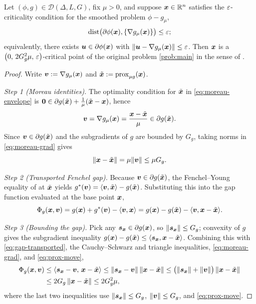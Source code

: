 \begin{lemma}
\label{lem:moreau-reduction}
Let $(\phi,g)\in\mathcal D(\Delta,L,G)$, fix $\mu>0$, and suppose
$\bm{x}\in\mathbb{R}^n$ satisfies the $\varepsilon$-criticality condition for the smoothed
problem $\phi-g_\mu$,
\[
    \operatorname{dist}\bigl(\partial\phi(\bm{x}),\{\nabla g_\mu(\bm{x})\}\bigr)\le\varepsilon ;
\]
equivalently, there exists $\bm{u}\in\partial\phi(\bm{x})$ with
$\|\bm{u}-\nabla g_\mu(\bm{x})\|\le\varepsilon$. Then $\bm{x}$ is a
$\bigl(0,\,2G_g^2\mu,\,\varepsilon\bigr)$-critical point of the original problem
\eqref{prob:main} in the sense of
.
\end{lemma}

\begin{proof}
Write $\bm{v}:=\nabla g_\mu(\bm{x})$ and $\tilde{\bm{x}}:=\mathrm{prox}_{\mu g}(\bm{x})$.

\emph{Step 1 (Moreau identities).}
The optimality condition for $\tilde{\bm{x}}$ in \eqref{eq:moreau-envelope} is
$\bm{0}\in\partial g(\tilde{\bm{x}})+\tfrac1\mu(\tilde{\bm{x}}-\bm{x})$, hence
\begin{equation}
    \bm{v}=\nabla g_\mu(\bm{x})=\frac{\bm{x}-\tilde{\bm{x}}}{\mu}\in\partial g(\tilde{\bm{x}}).
    \label{eq:moreau-grad}
\end{equation}
Since $\bm{v}\in\partial g(\tilde{\bm{x}})$ and the subgradients of $g$ are bounded by
$G_g$, taking norms in \eqref{eq:moreau-grad} gives
\begin{equation}
    \|\bm{x}-\tilde{\bm{x}}\|=\mu\|\bm{v}\|\le\mu G_g .
    \label{eq:prox-move}
\end{equation}

\emph{Step 2 (Transported Fenchel gap).}
Because $\bm{v}\in\partial g(\tilde{\bm{x}})$, the Fenchel--Young equality of
 at $\tilde{\bm{x}}$ yields
$g^*(\bm{v})=\langle\bm{v},\tilde{\bm{x}}\rangle-g(\tilde{\bm{x}})$. Substituting this into
the gap function evaluated at the base point $\bm{x}$,
\begin{equation}
    \Phi_g(\bm{x},\bm{v})
    =g(\bm{x})+g^*(\bm{v})-\langle\bm{v},\bm{x}\rangle
    =g(\bm{x})-g(\tilde{\bm{x}})-\langle\bm{v},\bm{x}-\tilde{\bm{x}}\rangle .
    \label{eq:gap-transported}
\end{equation}

\emph{Step 3 (Bounding the gap).}
Pick any $\bm{s}_{\bm{x}}\in\partial g(\bm{x})$, so $\|\bm{s}_{\bm{x}}\|\le G_g$; convexity of
$g$ gives the subgradient inequality
$g(\bm{x})-g(\tilde{\bm{x}})\le\langle\bm{s}_{\bm{x}},\bm{x}-\tilde{\bm{x}}\rangle$. Combining this
with \eqref{eq:gap-transported}, the Cauchy--Schwarz and triangle inequalities,
\eqref{eq:moreau-grad}, and \eqref{eq:prox-move},
\begin{align}
    \Phi_g(\bm{x},\bm{v})
    &\le \langle\bm{s}_{\bm{x}}-\bm{v},\,\bm{x}-\tilde{\bm{x}}\rangle
    \le \|\bm{s}_{\bm{x}}-\bm{v}\|\,\|\bm{x}-\tilde{\bm{x}}\|
    \le \bigl(\|\bm{s}_{\bm{x}}\|+\|\bm{v}\|\bigr)\,\|\bm{x}-\tilde{\bm{x}}\| \notag\\
    &\le 2G_g\,\|\bm{x}-\tilde{\bm{x}}\|
    \le 2G_g^2\mu ,
    \label{eq:gap-bound}
\end{align}
where the last two inequalities use $\|\bm{s}_{\bm{x}}\|\le G_g$,
$\|\bm{v}\|\le G_g$, and \eqref{eq:prox-move}.


\end{proof}
